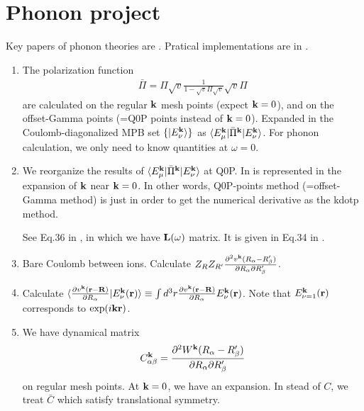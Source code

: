 \documentclass[a4paper,10pt,fleqn]{article}
\newcommand{\bfk}{{\bf k}}
\newcommand{\bfr}{{\bf r}}
\newcommand{\bfR}{{\bf R}}
\begin{document}
\newpage
\section{Phonon project}

Key papers of phonon theories are
\cite{pick_microscopic_1970}
\cite{vogl_microscopic_1976}
\cite{giannozzi_ab_1991}
\cite{sjakste_wannier_2015}.
Pratical implementations are in 
\cite{friedrich_efficient_2010}
\cite{kotani_formulation_2015}.

\begin{enumerate}
 \item 
 The polarization function 
 \begin{eqnarray}
  \bar{\Pi}=  \Pi \sqrt{v} \frac{1}{1-\sqrt{v}\Pi\sqrt{v}} \sqrt{v} \Pi
  \label{eq:barpi}
 \end{eqnarray}
  are calculated on the regular $\bfk$ mesh points (expect $\bfk=0$),
       and on the offset-Gamma points (=Q0P points instead of $\bfk=0$). 
       Expanded in the 
       Coulomb-diagonalized MPB set $\{|E^\bfk_\nu \rangle\}$ as
       $\langle E^\bfk_\mu|\bar{\Pi}^\bfk |E^\bfk_\nu \rangle$.
  For phonon calculation, we only need to know quantities at $\omega=0$.
 \item
   We reorganize the results of
   $\langle E^\bfk_\mu|\bar{\Pi}^\bfk |E^\bfk_\nu \rangle$ at Q0P.
   In is represented in the expansion of $\bfk$ near $\bfk=0$.
   In other words, Q0P-points method (=offset-Gamma method) is just
   in order to get the numerical derivative as the kdotp method.

  See Eq.36 in \cite{friedrich_efficient_2010},
  in which we have ${\bf L}(\omega)$ matrix. 
  It is given in Eq.34 in \cite{kotani_formulation_2015}.
   
 \item 
     Bare Coulomb between ions. 
     Calculate 
     $Z_{R} Z_{R'} \frac{\partial^2 v^\bfk(R_\alpha-R'_\beta)}{\partial {R_\alpha} \partial {R'_\beta}}$.
 \item 
  Calculate $\langle \frac{\partial v^\bfk(\bfr-\bfR)}
  {\partial{R_\alpha}} 
  |E^\bfk_\nu(\bfr) \rangle \equiv \int d^3r \frac{\partial v^\bfk(\bfr-\bfR)}{\partial {R_\alpha}} E^\bfk_\nu(\bfr)$. Note that $E_{\nu=1}^\bfk(\bfr)$ corresponds
  to $\exp(i \bfk \bfr)$.

  \item
  We have dynamical matrix
\begin{eqnarray}
   C^\bfk_{\alpha\beta}= \frac{\partial^2 W^\bfk(R_\alpha-R'_\beta)}
   {\partial {R_\alpha} \partial{R'_\beta}}
\end{eqnarray}   
on regular mesh points. At $\bfk=0$, we have an expansion.
In stead of $C$, we treat $\bar{C}$ which satisfy translational symmetry.


\end{enumerate}
\end{document}
